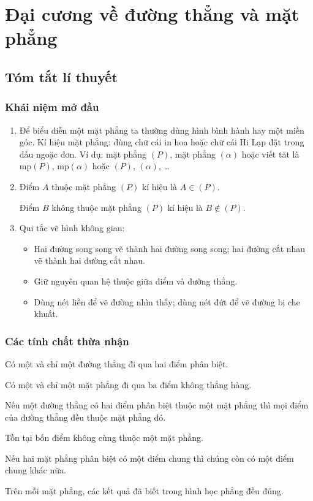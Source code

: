 \setcounter{section}{0}
\section{Đại cương về đường thẳng và mặt phẳng}
\subsection{Tóm tắt lí thuyết}
\subsubsection{Khái niệm mở đầu}
\begin{enumerate}
\item Để biểu diễn một mặt phẳng ta thường dùng hình bình hành hay một miền góc. Kí hiệu mặt phẳng: dùng chữ cái in hoa hoặc chữ cái Hi Lạp đặt trong dấu ngoặc đơn. Ví dụ: mặt phẳng $(P)$, mặt phẳng $(\alpha)$ hoặc viết tăt là mp$(P)$, mp$(\alpha)$ hoặc $(P)$, $(\alpha)$, \ldots
\item Điểm $A$ thuộc mặt phẳng $(P)$ kí hiệu là $A\in (P)$.

Điểm $B$ không thuộc mặt phẳng $(P)$ kí hiệu là $B\not\in (P)$.
\item Qui tắc vẽ hình không gian:
\begin{itemize}
	\item Hai đường song song vẽ thành hai đường song song; hai đường cắt nhau vẽ thành hai đường cắt nhau.
	\item Giữ nguyên quan hệ thuộc giữa điểm và đường thẳng.
	\item Dùng nét liền để vẽ đường nhìn thấy; dùng nét đứt để vẽ đường bị che khuất.
	\end{itemize}
\end{enumerate}	

\subsubsection{Các tính chất thừa nhận}
\begin{tc}
Có một và chỉ một đường thẳng đi qua hai điểm phân biệt.	
\end{tc}
\begin{tc}
Có một và chỉ một mặt phẳng đi qua ba điểm không thẳng hàng.	
\end{tc}
\begin{tc}
Nếu một đường thẳng có hai điểm phân biệt thuộc một mặt phẳng thì mọi điểm của đường thẳng đều thuộc mặt phẳng đó.	
\end{tc}
\begin{tc}
Tồn tại bốn điểm không cùng thuộc một mặt phẳng.	
\end{tc}
\begin{tc}
Nếu hai mặt phẳng phân biệt có một điểm chung thì chúng còn có một điểm chung khác nữa.	
\end{tc}
\begin{tc}
Trên mỗi mặt phẳng, các kết quả đã biết trong hình học phẳng đều đúng.	
\end{tc}

